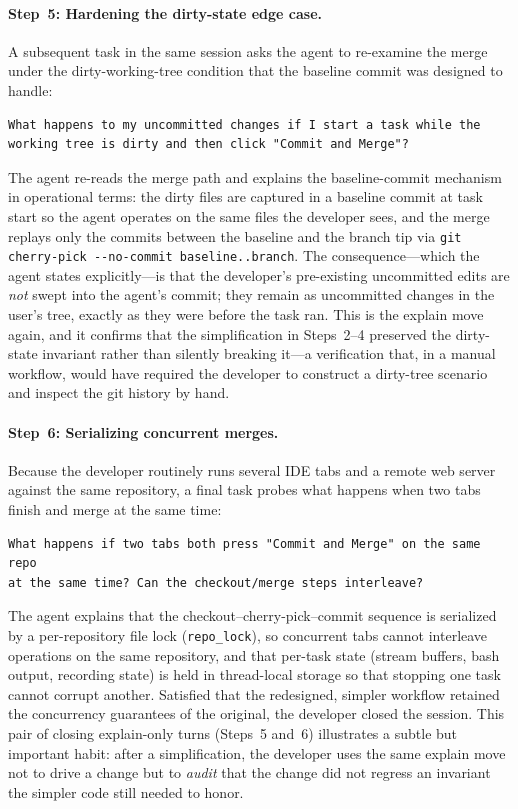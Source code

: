 \documentclass{article}
\begin{document}
\paragraph{Step~5: Hardening the dirty-state edge case.}
A subsequent task in the same session asks the agent to re-examine the
merge under the dirty-working-tree condition that the baseline commit
was designed to handle:

\begin{lstlisting}[style=prompt]
What happens to my uncommitted changes if I start a task while the
working tree is dirty and then click "Commit and Merge"?
\end{lstlisting}

\noindent The agent re-reads the merge path and explains the
baseline-commit mechanism in operational terms: the dirty files are
captured in a baseline commit at task start so the agent operates on
the same files the developer sees, and the merge replays only the
commits between the baseline and the branch tip via
\texttt{git cherry-pick -{}-no-commit baseline..branch}.
The consequence---which the agent states explicitly---is that the
developer's pre-existing uncommitted edits are \emph{not} swept into the
agent's commit; they remain as uncommitted changes in the user's tree,
exactly as they were before the task ran.
This is the explain move again, and it confirms that the simplification
in Steps~2--4 preserved the dirty-state invariant rather than silently
breaking it---a verification that, in a manual workflow, would have
required the developer to construct a dirty-tree scenario and inspect
the git history by hand.

\paragraph{Step~6: Serializing concurrent merges.}
Because the developer routinely runs several IDE tabs and a remote web
server against the same repository, a final task probes what happens
when two tabs finish and merge at the same time:

\begin{lstlisting}[style=prompt]
What happens if two tabs both press "Commit and Merge" on the same repo
at the same time? Can the checkout/merge steps interleave?
\end{lstlisting}

\noindent The agent explains that the checkout--cherry-pick--commit
sequence is serialized by a per-repository file lock
(\texttt{repo\_lock}), so concurrent tabs cannot interleave operations
on the same repository, and that per-task state (stream buffers, bash
output, recording state) is held in thread-local storage so that
stopping one task cannot corrupt another.
Satisfied that the redesigned, simpler workflow retained the
concurrency guarantees of the original, the developer closed the
session.
This pair of closing explain-only turns (Steps~5 and~6) illustrates a
subtle but important habit: after a simplification, the developer uses
the same explain move not to drive a change but to \emph{audit} that
the change did not regress an invariant the simpler code still needed
to honor.
\end{document}
